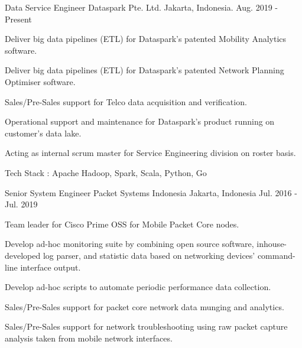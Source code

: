 

\begin{cventries}

\cventry
{Data Service Engineer} %
{Dataspark Pte. Ltd.} %
{Jakarta, Indonesia.} %
{Aug. 2019 - Present} %
{
  \begin{cvitems} %
    \item {Deliver big data pipelines (ETL) for Dataspark's patented Mobility Analytics software.}
    \item {Deliver big data pipelines (ETL) for Dataspark's patented Network Planning Optimiser software.}
    \item {Sales/Pre-Sales support for Telco data acquisition and verification.}
    \item {Operational support and maintenance for Dataspark's product running on customer's data lake.}
    \item {Acting as internal scrum master for Service Engineering division on roster basis.}
    
    Tech Stack : Apache Hadoop, Spark, Scala, Python, Go
  \end{cvitems}
}

  \cventry
    {Senior System Engineer} %
    {Packet Systems Indonesia} %
    {Jakarta, Indonesia} %
    {Jul. 2016 - Jul. 2019} %
    {
      \begin{cvitems} %
        \item {Team leader for Cisco Prime OSS for Mobile Packet Core nodes.}
        \item {Develop ad-hoc monitoring suite by combining open source software, inhouse-developed log parser, and statistic data based on networking devices' command-line interface output.}
        \item {Develop ad-hoc scripts to automate periodic performance data collection.}
        \item {Sales/Pre-Sales support for packet core network data munging and analytics.}
        \item {Sales/Pre-Sales support for network troubleshooting using raw packet capture analysis taken from mobile network interfaces.}
      \end{cvitems}
    }


\end{cventries}
